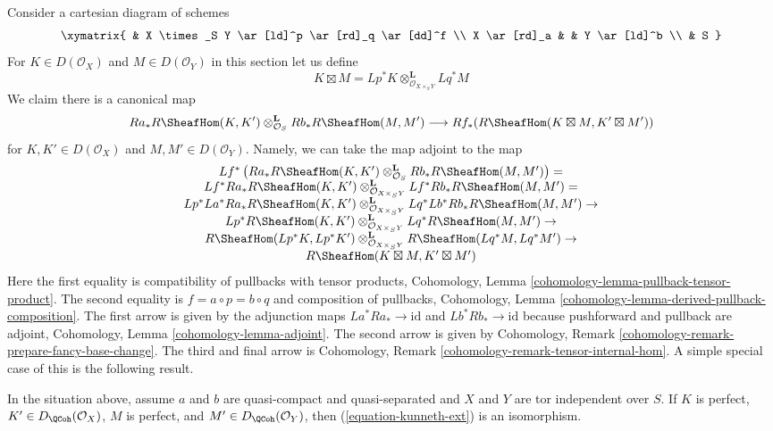 \noindent
Consider a cartesian diagram of schemes
$$
\xymatrix{
& X \times_S Y \ar[ld]^p \ar[rd]_q \ar[dd]^f \\
X \ar[rd]_a & & Y \ar[ld]^b \\
& S
}
$$
For $K \in D(\mathcal{O}_X)$ and $M \in D(\mathcal{O}_Y)$
in this section let us define
$$
K \boxtimes M =
Lp^*K \otimes_{\mathcal{O}_{X \times_S Y}}^\mathbf{L} Lq^*M
$$
We claim there is a canonical map
\begin{equation}
\label{equation-kunneth-ext}
Ra_*R\SheafHom(K, K')
\otimes_{\mathcal{O}_S}^\mathbf{L}
Rb_*R\SheafHom(M, M')
\longrightarrow
Rf_*(R\SheafHom(K \boxtimes M, K' \boxtimes M'))
\end{equation}
for $K, K' \in D(\mathcal{O}_X)$ and $M, M' \in D(\mathcal{O}_Y)$.
Namely, we can take the map adjoint to the map
$$
\begin{matrix}
Lf^*\left(Ra_*R\SheafHom(K, K')
\otimes_{\mathcal{O}_S}^\mathbf{L}
Rb_* R\SheafHom(M, M')\right) = \\
Lf^* Ra_* R\SheafHom(K, K')
\otimes_{\mathcal{O}_{X \times_S Y}}^\mathbf{L}
Lf^* Rb_* R\SheafHom(M, M') = \\
Lp^* La^* Ra_* R\SheafHom(K, K')
\otimes_{\mathcal{O}_{X \times_S Y}}^\mathbf{L}
Lq^* Lb^* Rb_* R\SheafHom(M, M') \to \\
Lp^* R\SheafHom(K, K')
\otimes_{\mathcal{O}_{X \times_S Y}}^\mathbf{L}
Lq^* R\SheafHom(M, M') \to \\
R\SheafHom(Lp^*K, Lp^*K')
\otimes_{\mathcal{O}_{X \times_S Y}}^\mathbf{L}
R\SheafHom(Lq^*M, Lq^*M') \to \\
R\SheafHom(K \boxtimes M, K' \boxtimes M')
\end{matrix}
$$
Here the first equality is compatibility of pullbacks with tensor products,
Cohomology, Lemma \ref{cohomology-lemma-pullback-tensor-product}.
The second equality is $f = a \circ p = b \circ q$ and
composition of pullbacks,
Cohomology, Lemma \ref{cohomology-lemma-derived-pullback-composition}.
The first arrow is given by the adjunction maps
$La^* Ra_* \to \text{id}$ and
$Lb^* Rb_* \to \text{id}$ because pushforward and pullback are adjoint,
Cohomology, Lemma \ref{cohomology-lemma-adjoint}.
The second arrow is given by
Cohomology, Remark \ref{cohomology-remark-prepare-fancy-base-change}.
The third and final arrow is
Cohomology, Remark \ref{cohomology-remark-tensor-internal-hom}.
A simple special case of this is the following result.

\begin{lemma}
\label{lemma-kunneth-Ext}
In the situation above, assume $a$ and $b$ are quasi-compact and
quasi-separated and $X$ and $Y$ are tor independent over $S$.
If $K$ is perfect, $K' \in D_\QCoh(\mathcal{O}_X)$, $M$ is perfect, and
$M' \in D_\QCoh(\mathcal{O}_Y)$, then (\ref{equation-kunneth-ext})
is an isomorphism.
\end{lemma}

